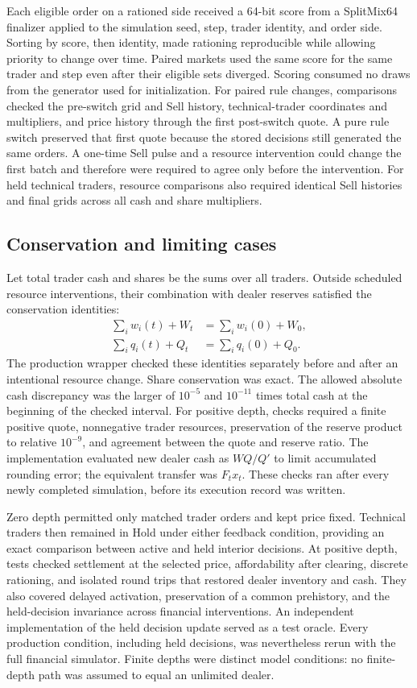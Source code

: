Each eligible order on a rationed side received a 64-bit score from a
SplitMix64 finalizer applied to the simulation seed, step, trader identity,
and order side. Sorting by score, then identity, made rationing reproducible
while allowing priority to change over time. Paired markets used the same
score for the same trader and step even after their eligible sets diverged.
Scoring consumed no draws from the generator used for initialization.
For paired rule changes, comparisons checked the pre-switch grid and Sell
history, technical-trader coordinates and multipliers, and price history
through the first post-switch quote. A pure rule switch preserved that
first quote because the stored decisions still generated the same orders.
A one-time Sell pulse and a resource intervention could change the first
batch and therefore were required to agree only before the intervention.
For held technical traders, resource comparisons also required identical
Sell histories and final grids across all cash and share multipliers.

\subsection{Conservation and limiting cases}

Let total trader cash and shares be the sums over all traders. Outside
scheduled resource interventions, their combination with dealer reserves
satisfied the conservation identities:
\begin{align*}
 \sum_i w_i(t)+W_t&=\sum_i w_i(0)+W_0,\\
 \sum_i q_i(t)+Q_t&=\sum_i q_i(0)+Q_0.
\end{align*}
The production wrapper checked these identities separately before and
after an intentional resource change. Share conservation was exact.
The allowed absolute cash discrepancy was the larger of $10^{-5}$ and
$10^{-11}$ times total cash at the beginning of the checked interval.
For positive depth, checks required a finite positive quote, nonnegative
trader resources, preservation of the reserve product to relative
$10^{-9}$, and agreement between the quote and reserve ratio.
The implementation evaluated new dealer cash as $WQ/Q'$ to limit
accumulated rounding error; the equivalent transfer was $F_tx_t$.
These checks ran after every newly completed simulation, before its
execution record was written.

Zero depth permitted only matched trader orders and kept price fixed.
Technical traders then remained in Hold under either feedback condition,
providing an exact comparison between active and held interior decisions.
At positive depth, tests checked settlement at the selected price,
affordability after clearing, discrete rationing, and isolated round
trips that restored dealer inventory and cash. They also covered delayed
activation, preservation of a common prehistory, and the held-decision
invariance across financial interventions. An independent implementation
of the held decision update served as a test oracle. Every production
condition, including held decisions, was nevertheless rerun with the full
financial simulator. Finite depths were distinct model conditions: no
finite-depth path was assumed to equal an unlimited dealer.

